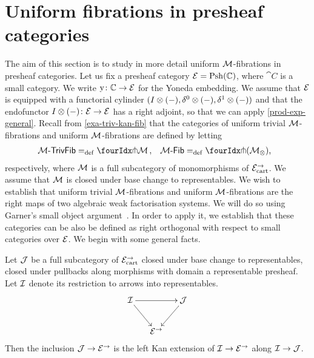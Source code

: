 \documentclass[reqno,10pt,a4paper,oneside,draft]{amsart}
\begin{document}
\section{Uniform fibrations in presheaf categories}
\label{sec:unifpc}

The aim of this section is to study in more detail uniform $\cal{M}$-fibrations in presheaf categories.
Let us fix a presheaf category $\catE = \Psh(\cat{C})$, where $\cat{C}$ is a small category.
We write $\yon \co \catC \to \catE$ for the Yoneda embedding.
We assume that $\catE$ is equipped with a functorial cylinder $( \interval \otimes (-), \lcyl \otimes (-), \rcyl \otimes (-))$ and that the endofunctor $ \interval\otimes (-) \co \catE \to \catE$ has a right adjoint, so that we can apply \cref{prod-exp-general}.
Recall from \cref{exa-triv-kan-fib} that the categories of uniform trivial $\cal{M}$-fibrations and uniform $\cal{M}$-fibrations are defined by letting
\[
\begin{aligned}
  \TrivFib{\cal{M}} &\defeq \liftr{\cal{M}}
\, ,&
  \Fib{\cal{M}} &\defeq \liftr{(\cal{M}_\otimes)}
\rlap{,}
\end{aligned}
\]
respectively, where $\cal{M}$ is a full subcategory of monomorphisms of $\catE_\cart^\to$.
We assume that $\cal{M}$ is closed under base change to representables.
We wish to establish that uniform trivial $\cal{M}$-fibrations and uniform $\cal{M}$-fibrations are the right maps of two algebraic weak factorisation systems.
We will do so using Garner's small object argument~\cite{garner:small-object-argument}.
In order to apply it, we establish that these categories can be also be defined as right orthogonal with respect to small categories over $\catE$.
We begin with some general facts.

\begin{lemma} \label{left-kan-extension-of-representables}
Let $\cal{J}$ be a full subcategory of $\catE_{\cart}^\to$ closed under base change to representables, \ie closed under pullbacks along morphisms with domain a representable presheaf.
Let $\cal{I}$ denote its restriction to arrows into representables.
\[
\xymatrix@C-1em{
  \cal{I}
  \ar[rr]
  \ar[dr]
&&
  \cal{J}
  \ar[dl]
\\&
  \catE^\to
}
\]
Then the inclusion $\cal{J} \to \catE^\to$ is the left Kan extension of $\cal{I} \to \catE^\to$ along $\cal{I} \to \cal{J}$.
\end{lemma}
\end{document}
